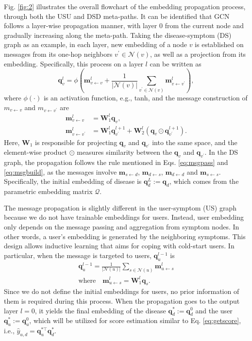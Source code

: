 \documentclass[sigconf]{acmart}
\newcommand{\q}{\bm{q}}
\newcommand{\m}{\bm{m}}
\newcommand{\W}{\bm{W}}
\newcommand{\rto}{\leftarrow}
\newcommand{\bn}{\mathcal{N}}
\begin{document}
Fig. \ref{fig:2} illustrates the overall flowchart of the embedding propagation process, through both the USU and DSD meta-paths. It can be identified that GCN follows a layer-wise propagation manner, with layer 0 from the current node and gradually increasing along the meta-path. Taking the disease-symptom (DS) graph as an example, in each layer, new embedding of a node $v$ is established on messages from its one-hop neighbors $v^\prime \in \bn(v)$, as well as a projection from its embedding. Specifically, this process on a layer $l$ can be written as
\begin{equation}
\q_v^{l} = \phi \left( \m_{v\rto v}^l + \frac1{|\bn(v)|}\sum_{v^\prime \in \bn(v)} \m_{v\rto v^\prime}^l \right),
\label{eq:msgpass}
\end{equation}
where $\phi(\cdot)$ is an activation function, e.g., tanh, and the message construction of $m_{v\rto v}$ and $m_{v \rto v^\prime}$ are
\begin{equation}
\begin{split}
\m_{v\rto v}^l  &= \W_1^l \q_v, \\
\m_{v\rto v^\prime}^l &= \W_1^l \q_{v^\prime}^{l+1} + \W_2^l (\q_{v} \odot \q_{v^\prime}^{l+1}) .
\end{split}
\label{eq:msgbuild}
\end{equation}
Here, $\W_1$ is responsible for projecting 
$\q_v$ and $\q_{v^\prime}$ into the same space, and the element-wise product $\odot$ measures similarity between the $\q_v$ and $\q_{v^\prime}$. In the DS graph, the propagation follows the rule mentioned in Eqs. \eqref{eq:msgpass} and \eqref{eq:msgbuild}, as the messages involve $\m_{s\rto d}$, $\m_{d\rto s}$, $\m_{d\rto d}$ and $\m_{s\rto s}$. Specifically, the initial embedding of disease is $\q_d^L := \q_d$, which comes from the parametric embedding matrix $\mathcal{Q}$. 

The message propagation is slightly different in the user-symptom (US) graph because we do not have trainable embeddings for users. Instead, user embedding only depends on the message passing and aggregation from symptom nodes. In other words, a user's embedding is generated by the neighboring symptoms. This design allows inductive learning that aims for coping with cold-start users. In particular, when the message is targeted to users, $\q_u^{l-1}$ is
\begin{equation}
\begin{split}
\q_u^{l-1} = \frac1{|\bn(u)|} \sum_{s \in \bn(u)} \m_{u \rto s}^{l} \\
\text{where} \quad  \m_{u \rto s}^{l} = \W_1^l \q_s.
\end{split}
\end{equation}
Since we do not define the initial embeddings for users, no prior information of them is required during this process. When the propagation goes to the output layer $l=0$, it yields the final embedding of the disease $\q^*_d := \q^0_d$ and the user $\q^*_u := \q^0_u$, which will be utilized for score estimation similar to Eq. \eqref{eq:getscore}, i.e., $\hat{y}_{u,d} = \q^{* \top}_u \q^*_d$.
\end{document}
